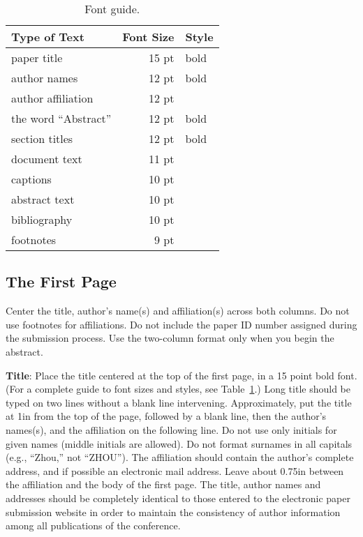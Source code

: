 \documentclass[11pt,letterpaper]{article}
\begin{document}
\begin{table}[h]
\begin{center}
\begin{tabular}{|l|rl|}
\hline \bf Type of Text & \bf Font Size & \bf Style \\ \hline
paper title & 15 pt & bold \\
author names & 12 pt & bold \\
author affiliation & 12 pt & \\
the word ``Abstract'' & 12 pt & bold \\
section titles & 12 pt & bold \\
document text & 11 pt  &\\
captions & 10 pt & \\
abstract text & 10 pt & \\
bibliography & 10 pt & \\
footnotes & 9 pt & \\
\hline
\end{tabular}
\end{center}
\caption{\label{font-table} Font guide. }
\end{table}

\subsection{The First Page}
\label{ssec:first}

Center the title, author's name(s) and affiliation(s) across both
columns. Do not use footnotes for affiliations.  Do not include the
paper ID number assigned during the submission process.
Use the two-column format only when you begin the abstract.

{\bf Title}: Place the title centered at the top of the first page, in
a 15 point bold font.  (For a complete guide to font sizes and styles, see Table~\ref{font-table}.)
Long title should be typed on two lines without
a blank line intervening. Approximately, put the title at 1in from the
top of the page, followed by a blank line, then the author's names(s),
and the affiliation on the following line.  Do not use only initials
for given names (middle initials are allowed). Do not format surnames
in all capitals (e.g., ``Zhou,'' not ``ZHOU'').  The affiliation should
contain the author's complete address, and if possible an electronic
mail address. Leave about 0.75in between the affiliation and the body
of the first page. The title, author names and addresses should be completely identical to those entered to the electronic paper submission website in order to maintain the consistency of author information among all publications of the conference.
\end{document}
